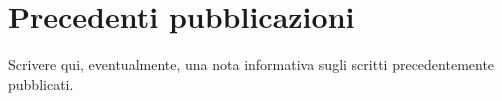 
\chapter*{Precedenti pubblicazioni}

Scrivere qui, eventualmente, una nota informativa sugli scritti precedentemente pubblicati.
